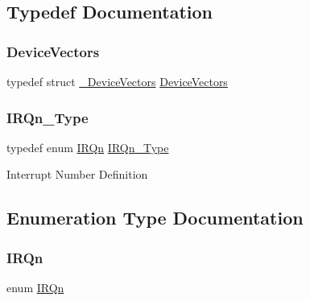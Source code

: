 \subsection{Typedef Documentation}
\mbox{\label{group___s_a_m_d21_g16_l__cmsis_gab68dc58361a6bbb8db7664200fc9cdda}} 
\subsubsection{\texorpdfstring{DeviceVectors}{DeviceVectors}}
{\footnotesize\ttfamily typedef struct \mbox{\hyperlink{struct___device_vectors}{\+\_\+\+Device\+Vectors}}  \mbox{\hyperlink{group___s_a_m_d21_e15_a__cmsis_gab68dc58361a6bbb8db7664200fc9cdda}{Device\+Vectors}}}

\mbox{\label{group___s_a_m_d21_g16_l__cmsis_gac3af4a32370fb28c4ade8bf2add80251}} 
\subsubsection{\texorpdfstring{IRQn\_Type}{IRQn\_Type}}
{\footnotesize\ttfamily typedef enum \mbox{\hyperlink{group___s_a_m_d21_e15_a__cmsis_ga666eb0caeb12ec0e281415592ae89083}{I\+R\+Qn}}  \mbox{\hyperlink{group___s_a_m_d21_e15_a__cmsis_gac3af4a32370fb28c4ade8bf2add80251}{I\+R\+Qn\+\_\+\+Type}}}

Interrupt Number Definition 

\subsection{Enumeration Type Documentation}
\mbox{\label{group___s_a_m_d21_g16_l__cmsis_ga666eb0caeb12ec0e281415592ae89083}} 
\subsubsection{\texorpdfstring{IRQn}{IRQn}}
{\footnotesize\ttfamily enum \mbox{\hyperlink{group___s_a_m_d21_e15_a__cmsis_ga666eb0caeb12ec0e281415592ae89083}{I\+R\+Qn}}}

